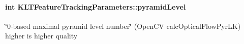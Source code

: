 \hypertarget{structKLTFeatureTrackingParameters_aeba87313d1ee04d20c8edbbc974a80ac}{
\paragraph[{pyramid\-Level}]{\setlength{\rightskip}{0pt plus 5cm}int K\-L\-T\-Feature\-Tracking\-Parameters\-::pyramid\-Level}}\label{structKLTFeatureTrackingParameters_aeba87313d1ee04d20c8edbbc974a80ac}


\char`\"{}0-\/based maximal pyramid level number\char`\"{} (Open\-C\-V calc\-Optical\-Flow\-Pyr\-L\-K) higher is higher quality 

